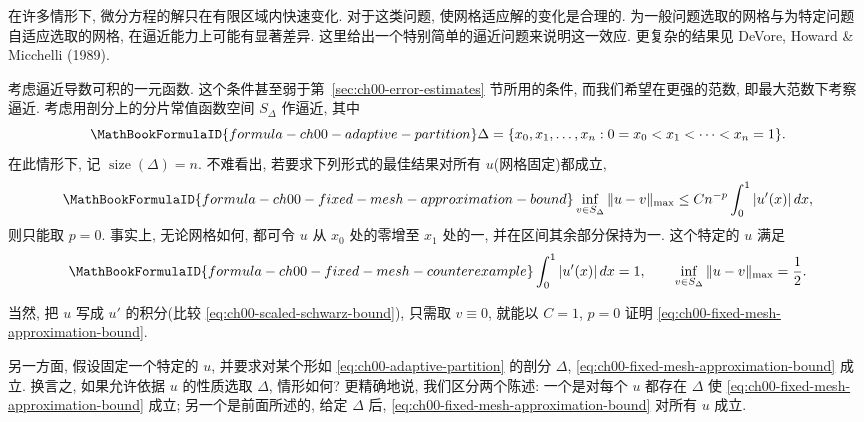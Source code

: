 在许多情形下, 微分方程的解只在有限区域内快速变化. 对于这类问题, 使网格适应解的变化是合理的. 为一般问题选取的网格与为特定问题自适应选取的网格, 在逼近能力上可能有显著差异. 这里给出一个特别简单的逼近问题来说明这一效应. 更复杂的结果见 DeVore, Howard \& Micchelli (1989).

考虑逼近导数可积的一元函数. 这个条件甚至弱于第~\ref{sec:ch00-error-estimates} 节所用的条件, 而我们希望在更强的范数, 即最大范数下考察逼近. 考虑用剖分上的分片常值函数空间 $S_\Delta$ 作逼近, 其中
\setcounter{equation}{0}
\begin{equation}
\MathBookFormulaID{formula-ch00-adaptive-partition}
\Delta=\{x_0,x_1,\ldots,x_n:0=x_0<x_1<\cdots<x_n=1\}.
\label{eq:ch00-adaptive-partition}
\end{equation}
在此情形下, 记 $\operatorname{size}(\Delta)=n$. 不难看出, 若要求下列形式的最佳结果对所有 $u$(网格固定)都成立,
\begin{equation}
\MathBookFormulaID{formula-ch00-fixed-mesh-approximation-bound}
\inf_{v\in S_\Delta}\|u-v\|_{\max}
\leq Cn^{-p}\int_0^1|u'(x)|\,dx,
\label{eq:ch00-fixed-mesh-approximation-bound}
\end{equation}
则只能取 $p=0$. 事实上, 无论网格如何, 都可令 $u$ 从 $x_0$ 处的零增至 $x_1$ 处的一, 并在区间其余部分保持为一. 这个特定的 $u$ 满足
\[
\MathBookFormulaID{formula-ch00-fixed-mesh-counterexample}
\int_0^1|u'(x)|\,dx=1,
\qquad
\inf_{v\in S_\Delta}\|u-v\|_{\max}=\frac12.
\]

当然, 把 $u$ 写成 $u'$ 的积分(比较 \eqref{eq:ch00-scaled-schwarz-bound}), 只需取 $v\equiv0$, 就能以 $C=1$, $p=0$ 证明 \eqref{eq:ch00-fixed-mesh-approximation-bound}.

另一方面, 假设固定一个特定的 $u$, 并要求对某个形如 \eqref{eq:ch00-adaptive-partition} 的剖分 $\Delta$, \eqref{eq:ch00-fixed-mesh-approximation-bound} 成立. 换言之, 如果允许依据 $u$ 的性质选取 $\Delta$, 情形如何? 更精确地说, 我们区分两个陈述: 一个是对每个 $u$ 都存在 $\Delta$ 使 \eqref{eq:ch00-fixed-mesh-approximation-bound} 成立; 另一个是前面所述的, 给定 $\Delta$ 后, \eqref{eq:ch00-fixed-mesh-approximation-bound} 对所有 $u$ 成立.

